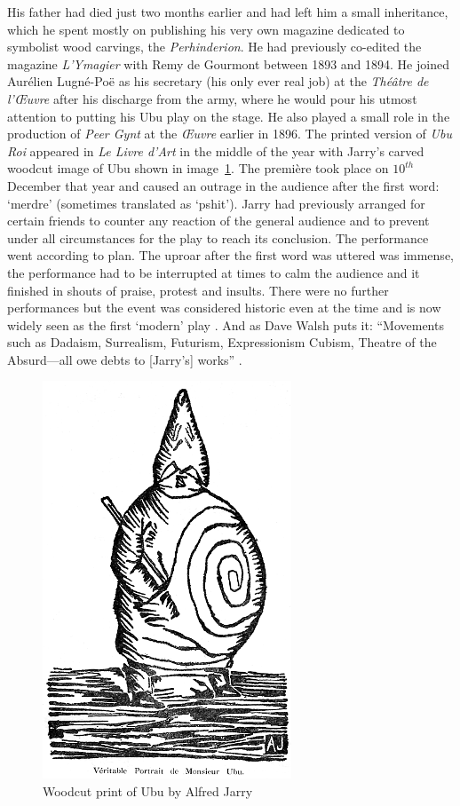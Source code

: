 His father had died just two months earlier and had left him a small inheritance, which he spent mostly on publishing his very own magazine dedicated to symbolist wood carvings, the \textit{Perhinderion}. He had previously co-edited the magazine \textit{L'Ymagier} with Remy de Gourmont between 1893 and 1894. He joined Aurélien Lugné-Poë as his secretary (his only ever real job) at the \textit{Théâtre de l'Œuvre} after his discharge from the army, where he would pour his utmost attention to putting his Ubu play on the stage. He also played a small role in the production of \textit{Peer Gynt} at the \textit{Œuvre} earlier in 1896. The printed version of \textit{Ubu Roi} appeared in \textit{Le Livre d'Art} in the middle of the year with Jarry's carved woodcut image of Ubu shown in image~\ref{img:UBU}. The première took place on $10^{th}$ December that year and caused an outrage in the audience after the first word: `merdre' (sometimes translated as `pshit'). Jarry had previously arranged for certain friends to counter any reaction of the general audience and to prevent under all circumstances for the play to reach its conclusion. The performance went according to plan. The uproar after the first word was uttered was immense, the performance had to be interrupted at times to calm the audience and it finished in shouts of praise, protest and insults. There were no further performances but the event was considered historic even at the time and is now widely seen as the first `modern' play \autocite{Brotchie2011a}. And as Dave Walsh puts it: ``Movements such as Dadaism, Surrealism, Futurism, Expressionism Cubism, Theatre of the Absurd---all owe debts to [Jarry's] works'' \autocite*{Walsh2001}.

\begin{figure}[!htbp] %
  \centering
  \includegraphics[height=0.6\textheight]{images/ubu}
  \caption[Woodcut print of Ubu]{Woodcut print of Ubu by Alfred Jarry}
\label{img:UBU}
\end{figure}

